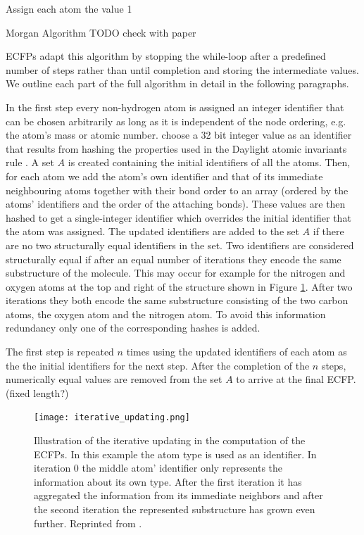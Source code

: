 \begin{algorithm}[t]
	\SetAlgoLined
	Assign each atom the value 1\;
	\caption{Morgan Algorithm TODO check with paper}
	\label{algo:morgan}
\end{algorithm}
ECFPs adapt this algorithm by stopping the while-loop after a predefined number of steps rather than until completion and storing the intermediate values. We outline each part of the full algorithm in detail in the following paragraphs.

In the first step every non-hydrogen atom is assigned an integer identifier that can be chosen arbitrarily as long as it is independent of the node ordering, e.g. the atom's mass or atomic number. \cite{ECFP} choose a 32 bit integer value as an identifier that results from hashing the properties used in the Daylight atomic invariants rule \citep{smiles2}. A set $A$ is created containing the initial identifiers of all the atoms. Then, for each atom we add the atom's own identifier and that of its immediate neighbouring atoms together with their bond order to an array (ordered by the atoms' identifiers and the order of the attaching bonds). These values are then hashed to get a single-integer identifier which overrides the initial identifier that the atom was assigned. The updated identifiers are added to the set $A$ if there are no two structurally equal identifiers in the set. Two identifiers are considered structurally equal if after an equal number of iterations they encode the same substructure of the molecule. This may occur for example for the nitrogen and oxygen atoms at the top and right of the structure shown in Figure \ref{fig:iteration_ECFP}. After two iterations they both encode the same substructure consisting of the two carbon atoms, the oxygen atom and the nitrogen atom. To avoid this information redundancy only one of the corresponding hashes is added.

The first step is repeated $n$ times using the updated identifiers of each atom as the the initial identifiers for the next step. After the completion of the $n$ steps, numerically equal values are removed from the set $A$ to arrive at the final ECFP. (fixed length?)
\begin{figure}[h]
	\centering 
	\texttt{[image: iterative\_updating.png]}
	\caption{Illustration of the iterative updating in the computation of the ECFPs. In this example the atom type is used as an identifier. In iteration 0 the middle atom' identifier only represents the information about its own type. After the first iteration it has aggregated the information from its immediate neighbors and after the second iteration the represented substructure has grown even further. Reprinted from \cite{ECFP}. }
	\label{fig:iteration_ECFP}
\end{figure}


